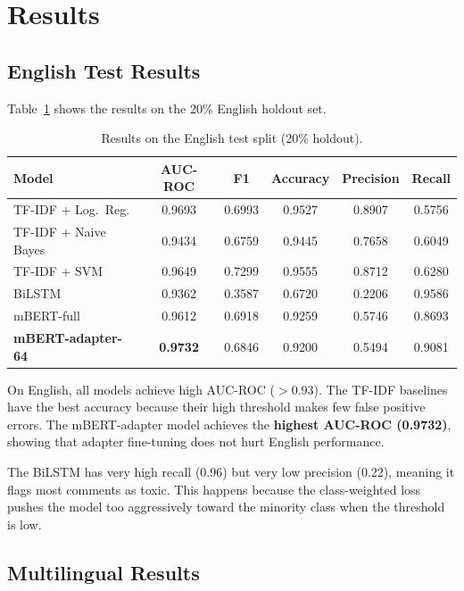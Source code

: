 \documentclass[11pt,a4paper]{article}
\begin{document}
\section{Results}

\subsection{English Test Results}

Table~\ref{tab:english} shows the results on the 20\% English holdout set.

\begin{table}[H]
\centering
\caption{Results on the English test split (20\% holdout).}
\label{tab:english}
\begin{tabular}{lccccc}
\toprule
\textbf{Model} & \textbf{AUC-ROC} & \textbf{F1} & \textbf{Accuracy} & \textbf{Precision} & \textbf{Recall} \\
\midrule
TF-IDF + Log.\ Reg.      & 0.9693 & 0.6993 & 0.9527 & 0.8907 & 0.5756 \\
TF-IDF + Naive Bayes      & 0.9434 & 0.6759 & 0.9445 & 0.7658 & 0.6049 \\
TF-IDF + SVM               & 0.9649 & 0.7299 & 0.9555 & 0.8712 & 0.6280 \\
BiLSTM                      & 0.9362 & 0.3587 & 0.6720 & 0.2206 & 0.9586 \\
mBERT-full                  & 0.9612 & 0.6918 & 0.9259 & 0.5746 & 0.8693 \\
\textbf{mBERT-adapter-64}   & \textbf{0.9732} & 0.6846 & 0.9200 & 0.5494 & 0.9081 \\
\bottomrule
\end{tabular}
\end{table}

On English, all models achieve high AUC-ROC ($>$0.93). The TF-IDF baselines
have the best accuracy because their high threshold makes few false positive
errors. The mBERT-adapter model achieves the \textbf{highest AUC-ROC (0.9732)},
showing that adapter fine-tuning does not hurt English performance.

The BiLSTM has very high recall (0.96) but very low precision (0.22), meaning
it flags most comments as toxic. This happens because the class-weighted loss
pushes the model too aggressively toward the minority class when the threshold
is low.

\subsection{Multilingual Results}
\end{document}
